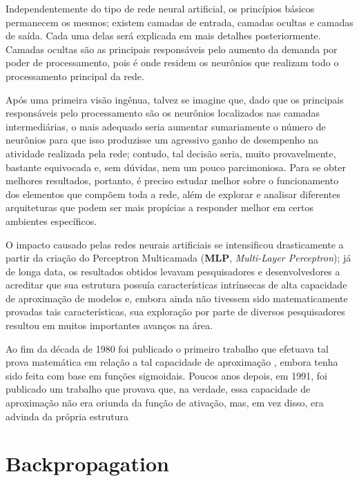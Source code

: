 Independentemente do tipo de rede neural artificial, os princípios básicos permanecem os mesmos; existem camadas de entrada, camadas ocultas e camadas de saída. Cada uma delas será explicada em mais detalhes posteriormente. Camadas ocultas são as principais responsáveis pelo aumento da demanda por poder de processamento, pois é onde residem os neurônios que realizam todo o processamento principal da rede.

Após uma primeira visão ingênua, talvez se imagine que, dado que os principais responsáveis pelo processamento são os neurônios localizados nas camadas intermediárias, o mais adequado seria aumentar sumariamente o número de neurônios para que isso produzisse um agressivo ganho de desempenho na atividade realizada pela rede; contudo, tal decisão seria, muito provavelmente, bastante equivocada e, sem dúvidas, nem um pouco parcimoniosa. Para se obter melhores resultados, portanto, é preciso estudar melhor sobre o funcionamento dos elementos que compõem toda a rede, além de explorar e analisar diferentes arquiteturas que podem ser mais propícias a responder melhor em certos ambientes específicos.

O impacto causado pelas redes neurais artificiais se intensificou drasticamente a partir da criação do Perceptron Multicamada (\textbf{MLP}, \textit{Multi-Layer Perceptron}); já de longa data, os resultados obtidos levavam pesquisadores e desenvolvedores a acreditar que sua estrutura possuía características intrínsecas de alta capacidade de aproximação de modelos e, embora ainda não tivessem sido matematicamente provadas tais características, sua exploração por parte de diversos pesquisadores resultou em muitos importantes avanços na área.

Ao fim da década de 1980 foi publicado o primeiro trabalho que efetuava tal prova matemática em relação a tal capacidade de aproximação \citep{hornik1989multilayer}, embora tenha sido feita com base em funções sigmoidais. Poucos anos depois, em 1991, foi publicado um trabalho que provava que, na verdade, essa capacidade de aproximação não era oriunda da função de ativação, mas, em vez disso, era advinda da própria estrutura 





\section{Backpropagation}
\label{sec:ann_backpropagation}



